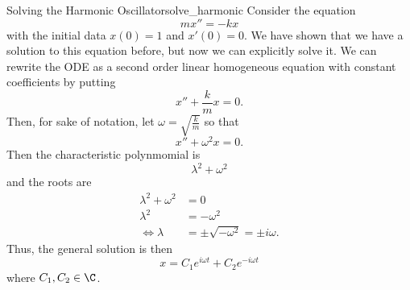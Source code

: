         \begin{ex}{Solving the Harmonic Oscillator}{solve_harmonic}
        Consider the equation
        \[
        mx''=-kx
        \]
        with the initial data $x(0)=1$ and $x'(0)=0$. We have shown that we have a solution to this equation before, but now we can explicitly solve it.  We can rewrite the ODE as a second order linear homogeneous equation with constant coefficients by putting
        \[
        x''+\frac{k}{m}x=0.
        \]
        Then, for sake of notation, let $\omega = \sqrt{\frac{k}{m}}$ so that
        \[
        x''+\omega^2x=0.
        \]
        Then the characteristic polynmomial is
        \[
        \lambda^2+\omega^2
        \]
        and the roots are
        \begin{align*}
            \lambda^2+\omega^2&=0\\
            \lambda^2&=-\omega^2\\
            \iff \lambda&= \pm \sqrt{-\omega^2}= \pm i \omega.
        \end{align*}
        Thus, the general solution is then
        \[
        x=C_1 e^{i\omega t}+C_2e^{-i\omega t}
        \]
        where $C_1,C_2\in \C$.


\end{ex}
